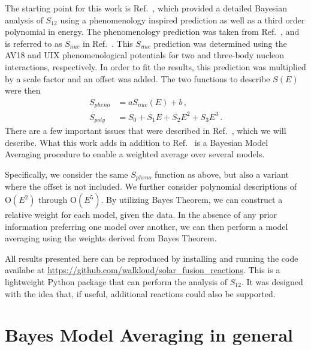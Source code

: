 \documentclass[prd,11pt,superscriptaddress,notitlepage,tightenlines,nofootinbib,floatfix]{revtex4-1}
\begin{document}
The starting point for this work is Ref.~\cite{Moscoso:2021xog}, which provided a detailed Bayesian analysis of $S_{12}$ using a phenomenology inspired prediction as well as a third order polynomial in energy.
The phenomenology prediction was taken from Ref.~\cite{Marcucci:2005zc}, 
and is referred to as $S_{nuc}$ in Ref.~\cite{Moscoso:2021xog}. 
This $S_{nuc}$ prediction was determined using the AV18 and UIX phenomenological potentials for two and three-body nucleon interactions, respectively.
In order to fit the results, this prediction was multiplied by a scale factor and an offset was added.
The two functions to describe $S(E)$ were then
\begin{align}
S_{pheno} &= a S_{nuc}(E) + b\, ,
\nonumber\\
S_{poly} &= S_0 + S_1 E + S_2 E^2 + S_3 E^3\, .
\end{align}
There are a few important issues that were described in Ref.~\cite{Moscoso:2021xog}, which we will describe.
What this work adds in addition to Ref.~\cite{Moscoso:2021xog} is a Bayesian Model Averaging procedure to enable a weighted average over several models.

Specifically, we consider the same $S_{pheno}$ function as above, but also a variant where the offset is not included.  We further consider polynomial descriptions of $\mathrm{O}(E^2)$ through $\mathrm{O}(E^5)$.
By utilizing Bayes Theorem, we can construct a relative weight for each model, given the data.  In the absence of any prior information preferring one model over another, we can then perform a model averaging using the weights derived from Bayes Theorem.

All results presented here can be reproduced by installing and running the code availabe at \url{https://github.com/walkloud/solar_fusion_reactions}.
This is a lightweight Python package that can perform the analysis of $S_{12}$.  It was designed with the idea that, if useful, additional reactions could also be supported.


\section{Bayes Model Averaging in general \label{sec:bma}}
\end{document}
